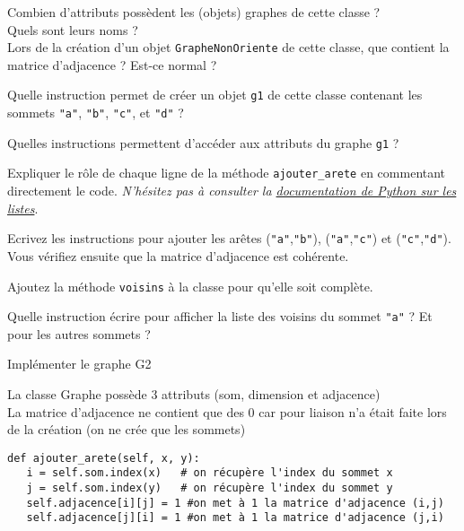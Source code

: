 \documentclass[12pt]{book}
\begin{document}



\Quest[1] Combien d'attributs possèdent les (objets) graphes de cette classe ?\\ Quels sont leurs noms ?\\
Lors de la création d'un objet \texttt{GrapheNonOriente} de cette classe, que contient la matrice d'adjacence ? Est-ce normal ?

\Quest Quelle instruction permet de créer un objet \texttt{g1} de cette classe contenant les sommets \texttt{"a"}, \texttt{"b"}, \texttt{"c"}, et \texttt{"d"} ?

    
\Quest Quelles instructions permettent d'accéder aux attributs du graphe \texttt{g1} ?

  
\Quest Expliquer le rôle de chaque ligne de la méthode
\texttt{ajouter\_arete} en commentant directement le code.
\emph{N'hésitez pas à consulter la
\href{https://docs.python.org/fr/3/tutorial/datastructures.html}{documentation
de Python sur les listes}}.

\Quest Ecrivez les instructions pour ajouter les arêtes (\texttt{"a"},\texttt{"b"}), (\texttt{"a"},\texttt{"c"}) et (\texttt{"c"},\texttt{"d"}). Vous vérifiez ensuite que la matrice d'adjacence est cohérente.


\Quest Ajoutez la méthode \texttt{voisins} à la classe
pour qu'elle soit complète.

\Quest Quelle instruction écrire pour afficher la liste
des voisins du sommet \texttt{"a"} ? Et pour les autres sommets ?

\Quest Implémenter le graphe G2

\begin{sol}
 \Quest[1] La classe Graphe possède 3 attributs (som, dimension et adjacence)\\
 La matrice d'adjacence ne contient que des 0 car pour liaison n'a était faite lors de la création (on ne crée que les sommets)
  \Quest 
   \Quest 
  \Quest 
  \begin{lstlisting}
def ajouter_arete(self, x, y):
   i = self.som.index(x)   # on récupère l'index du sommet x
   j = self.som.index(y)   # on récupère l'index du sommet y
   self.adjacence[i][j] = 1 #on met à 1 la matrice d'adjacence (i,j)
   self.adjacence[j][i] = 1 #on met à 1 la matrice d'adjacence (j,i)
    \end{lstlisting}  
  \Quest 
   \Quest 
    \Quest 
     \Quest 
\end{sol}
\end{document}
